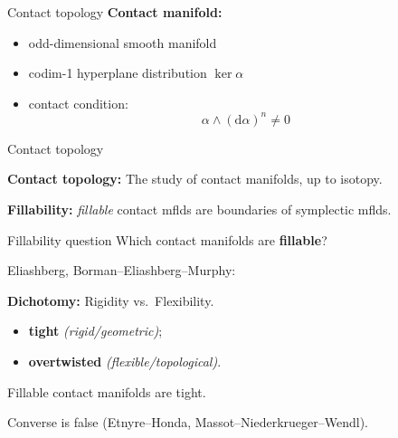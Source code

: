 \documentclass{beamer}
\begin{document}
\begin{frame}{Contact topology}
    \textbf{Contact manifold:}
    \begin{itemize}
        \item odd-dimensional smooth manifold
        \item codim-1 hyperplane distribution $\ker \alpha$
        \item contact condition: 
        \[ 
            \alpha \wedge (\mathrm{d} \alpha)^n \neq 0
        \]
    \end{itemize}
\end{frame}

\begin{frame}{Contact topology}

\textbf{Contact topology:} The study of contact manifolds, up to isotopy.

\medskip

\pause

\textbf{Fillability:} \emph{fillable} contact mflds are boundaries of symplectic mflds.

\pause

\begin{exampleblock}{Fillability question}  Which contact manifolds are \textbf{fillable}?
\end{exampleblock}

\pause

Eliashberg, Borman--Eliashberg--Murphy:

\begin{tcolorbox}
\textbf{Dichotomy:} Rigidity vs.\ Flexibility. 
\begin{itemize}
    \item \textbf{tight} \emph{(rigid/geometric)};
    \item  \textbf{overtwisted} \emph{(flexible/topological)}. 
\end{itemize}
\end{tcolorbox} 

\pause

\begin{theorem}
Fillable contact manifolds are tight.
\end{theorem}

Converse is false (Etnyre--Honda, Massot--Niederkrueger--Wendl).

\end{frame}
\end{document}
